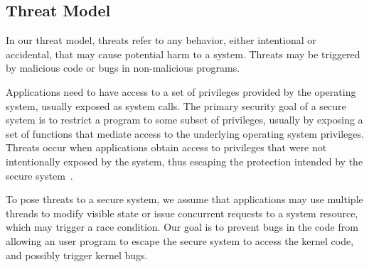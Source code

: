 \subsection{Threat Model}
In our threat model, threats refer to any behavior, either intentional or accidental, that may cause potential harm 
to a system. Threats may be triggered by malicious code or bugs in non-malicious programs.

Applications need to have access to a set of privileges provided by 
the operating system, usually exposed as system calls. The primary security goal of a secure system is to 
restrict a program to some subset of privileges, usually by exposing a set of functions that mediate 
access to the underlying operating system privileges. Threats occur when applications obtain access to 
privileges that were not intentionally exposed by the system, thus escaping the protection 
intended by the secure system~\cite{Repy:10}.

To pose threats to a secure system, we assume that applications may use multiple threads to modify visible 
state or issue concurrent requests to a system resource, which may trigger a race condition. Our goal is to prevent bugs in 
the code from allowing an user program to escape the secure system to access the kernel code, and 
possibly trigger kernel bugs.
